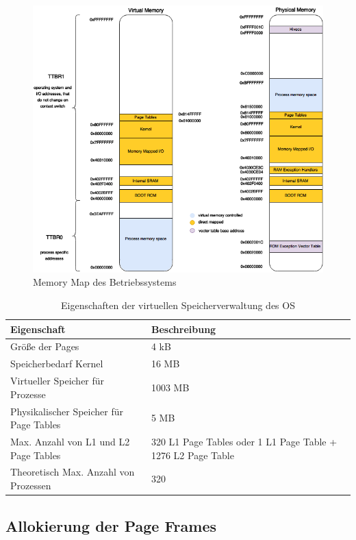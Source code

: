 \begin{figure}[H]
	\includegraphics[scale=0.7]{figures/MemoryMap}
	\caption{Memory Map des Betriebssystems}
	\label{fig:MemoryMap}
\end{figure}

\begin{table}[H]
\begin{tabular}{p{7cm} | p{7cm}}
  \textbf{Eigenschaft} & \textbf{Beschreibung} \\ \hline
  Größe der Pages & 4 kB\\
  Speicherbedarf Kernel & 16 MB\\
  Virtueller Speicher für Prozesse & 1003 MB\\
  Physikalischer Speicher für Page Tables	& 5 MB\\
  Max. Anzahl von L1 und L2 Page Tables & 320 L1 Page Tables oder 1 L1 Page Table + 1276 L2 Page  Table\\
  Theoretisch Max. Anzahl von Prozessen & 320\\
 \end{tabular}
 \caption{Eigenschaften der virtuellen Speicherverwaltung des OS}
 \label{table:SpecifiedVirtualMemory}
\end{table}







\subsection{Allokierung der Page Frames}

